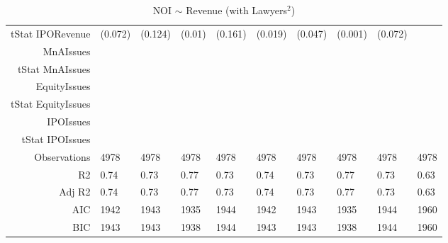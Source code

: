 \begin{table}[ht]
\begin{tabular}{rlllllllll}
  tStat IPORevenue & (0.072) & (0.124) & (0.01) & (0.161) & (0.019) & (0.047) & (0.001) & (0.072) &  \\ 
  MnAIssues &  &  &  &  &  &  &  &  &  \\ 
  tStat MnAIssues &  &  &  &  &  &  &  &  &  \\ 
  EquityIssues &  &  &  &  &  &  &  &  &  \\ 
  tStat EquityIssues &  &  &  &  &  &  &  &  &  \\ 
  IPOIssues &  &  &  &  &  &  &  &  &  \\ 
  tStat IPOIssues &  &  &  &  &  &  &  &  &  \\ 
  Observations & 4978 & 4978 & 4978 & 4978 & 4978 & 4978 & 4978 & 4978 & 4978 \\ 
  R2 & 0.74 & 0.73 & 0.77 & 0.73 & 0.74 & 0.73 & 0.77 & 0.73 & 0.63 \\ 
  Adj R2 & 0.74 & 0.73 & 0.77 & 0.73 & 0.74 & 0.73 & 0.77 & 0.73 & 0.63 \\ 
  AIC & 1942 & 1943 & 1935 & 1944 & 1942 & 1943 & 1935 & 1944 & 1960 \\ 
  BIC & 1943 & 1943 & 1938 & 1944 & 1943 & 1943 & 1938 & 1944 & 1960 \\ 
   \hline
\end{tabular}
\caption{NOI $\sim$ Revenue (with Lawyers$^2$)} 
\end{table}
